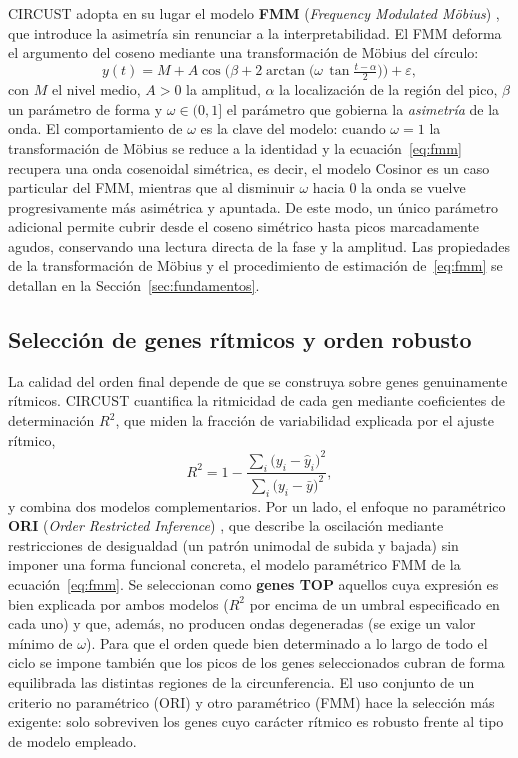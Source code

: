 \documentclass[12pt, a4paper]{report}
\begin{document}
CIRCUST adopta en su lugar el modelo \textbf{FMM} (\textit{Frequency Modulated Möbius}) \cite{fmmAlgorithm}, que introduce la asimetría sin renunciar a la interpretabilidad. El FMM deforma el argumento del coseno mediante una transformación de Möbius del círculo:
\begin{equation}
    y(t) = M + A\cos\!\Big(\beta + 2\arctan\!\big(\omega\,\tan\tfrac{t-\alpha}{2}\big)\Big) + \varepsilon,
    \label{eq:fmm}
\end{equation}
con $M$ el nivel medio, $A>0$ la amplitud, $\alpha$ la localización de la región del pico, $\beta$ un parámetro de forma y $\omega\in(0,1]$ el parámetro que gobierna la \emph{asimetría} de la onda. El comportamiento de $\omega$ es la clave del modelo: cuando $\omega=1$ la transformación de Möbius se reduce a la identidad y la ecuación~\eqref{eq:fmm} recupera una onda cosenoidal simétrica, es decir, el modelo Cosinor es un caso particular del FMM, mientras que al disminuir $\omega$ hacia $0$ la onda se vuelve progresivamente más asimétrica y apuntada. De este modo, un único parámetro adicional permite cubrir desde el coseno simétrico hasta picos marcadamente agudos, conservando una lectura directa de la fase y la amplitud. Las propiedades de la transformación de Möbius y el procedimiento de estimación de~\eqref{eq:fmm} se detallan en la Sección~\ref{sec:fundamentos}.

\subsection{Selección de genes rítmicos y orden robusto}
\label{subsec:topgenes-intro}

La calidad del orden final depende de que se construya sobre genes genuinamente rítmicos. CIRCUST cuantifica la ritmicidad de cada gen mediante coeficientes de determinación $R^2$, que miden la fracción de variabilidad explicada por el ajuste rítmico,
\begin{equation}
    R^2 = 1 - \frac{\sum_i \big(y_i - \hat{y}_i\big)^2}{\sum_i \big(y_i - \bar{y}\big)^2},
    \label{eq:r2}
\end{equation}
y combina dos modelos complementarios. Por un lado, el enfoque no paramétrico \textbf{ORI} (\textit{Order Restricted Inference}) \cite{larribaORI}, que describe la oscilación mediante restricciones de desigualdad (un patrón unimodal de subida y bajada) sin imponer una forma funcional concreta, el modelo paramétrico FMM de la ecuación~\eqref{eq:fmm}. Se seleccionan como \textbf{genes TOP} aquellos cuya expresión es bien explicada por ambos modelos ($R^2$ por encima de un umbral especificado en cada uno) y que, además, no producen ondas degeneradas (se exige un valor mínimo de $\omega$). Para que el orden quede bien determinado a lo largo de todo el ciclo se impone también que los picos de los genes seleccionados cubran de forma equilibrada las distintas regiones de la circunferencia. El uso conjunto de un criterio no paramétrico (ORI) y otro paramétrico (FMM) hace la selección más exigente: solo sobreviven los genes cuyo carácter rítmico es robusto frente al tipo de modelo empleado.
\end{document}
